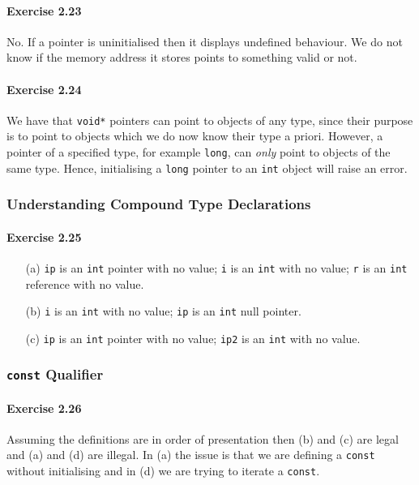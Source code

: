\paragraph{Exercise 2.23}
No. If a pointer is uninitialised then it displays undefined behaviour. We do not know if the memory address it stores points to something valid or not.

\paragraph{Exercise 2.24}
We have that \texttt{void*} pointers can point to objects of any type, since their purpose is to point to objects which we do now know their type a priori. However, a pointer of a specified type, for example \texttt{long}, can \textit{only} point to objects of the same type. Hence, initialising a \texttt{long} pointer to an \texttt{int} object will raise an error.

\subsubsection{Understanding Compound Type Declarations}

\paragraph{Exercise 2.25}
\begin{itemize}
	\item [(a)]
		\texttt{ip} is an \texttt{int} pointer with no value; \texttt{i} is an \texttt{int} with no value; \texttt{r} is an \texttt{int} reference with no value.
	\item [(b)]
		\texttt{i} is an \texttt{int} with no value; \texttt{ip} is an \texttt{int} null pointer.
	\item [(c)]
		\texttt{ip} is an \texttt{int} pointer with no value; \texttt{ip2} is an \texttt{int} with no value.
\end{itemize}

\subsubsection{\texttt{const} Qualifier}

\paragraph{Exercise 2.26}
Assuming the definitions are in order of presentation then (b) and (c) are legal and (a) and (d) are illegal. In (a) the issue is that we are defining a \texttt{const} without initialising and in (d) we are trying to iterate a \texttt{const}.

